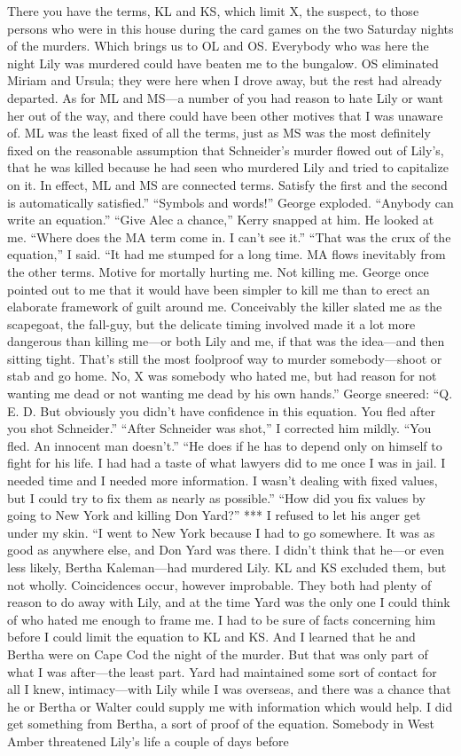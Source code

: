 \documentclass{novel}
\begin{document}
There you have the terms, KL and KS, which limit X, the suspect, to those persons who were in this house during the card games on the two Saturday nights of the murders. Which brings us to OL and OS. Everybody who was here the night Lily was murdered could have beaten me to the bungalow. OS eliminated Miriam and Ursula; they were here when I drove away, but the rest had already departed. As for ML and MS—a number of you had reason to hate Lily or want her out of the way, and there could have been other motives that I was unaware of. ML was the least fixed of all the terms, just as MS was the most definitely fixed on the reasonable assumption that Schneider’s murder flowed out of Lily’s, that he was killed because he had seen who murdered Lily and tried to capitalize on it. In effect, ML and MS are connected terms. Satisfy the first and the second is automatically satisfied.” “Symbols and words!” George exploded. “Anybody can write an equation.” “Give Alec a chance,” Kerry snapped at him. He looked at me. “Where does the MA term come in. I can’t see it.” “That was the crux of the equation,” I said. “It had me stumped for a long time. MA flows inevitably from the other terms. Motive for mortally hurting me. Not killing me. George once pointed out to me that it would have been simpler to kill me than to erect an elaborate framework of guilt around me. Conceivably the killer slated me as the scapegoat, the fall-guy, but the delicate timing involved made it a lot more dangerous than killing me—or both Lily and me, if that was the idea—and then sitting tight. That’s still the most foolproof way to murder somebody—shoot or stab and go home. No, X was somebody who hated me, but had reason for not wanting me dead or not wanting me dead by his own hands.” George sneered: “Q. E. D. But obviously you didn’t have confidence in this equation. You fled after you shot Schneider.” “After Schneider was shot,” I corrected him mildly. “You fled. An innocent man doesn’t.” “He does if he has to depend only on himself to fight for his life. I had had a taste of what lawyers did to me once I was in jail. I needed time and I needed more information. I wasn’t dealing with fixed values, but I could try to fix them as nearly as possible.” “How did you fix values by going to New York and killing Don Yard?” *** I refused to let his anger get under my skin. “I went to New York because I had to go somewhere. It was as good as anywhere else, and Don Yard was there. I didn’t think that he—or even less likely, Bertha Kaleman—had murdered Lily. KL and KS excluded them, but not wholly. Coincidences occur, however improbable. They both had plenty of reason to do away with Lily, and at the time Yard was the only one I could think of who hated me enough to frame me. I had to be sure of facts concerning him before I could limit the equation to KL and KS. And I learned that he and Bertha were on Cape Cod the night of the murder. But that was only part of what I was after—the least part. Yard had maintained some sort of contact for all I knew, intimacy—with Lily while I was overseas, and there was a chance that he or Bertha or Walter could supply me with information which would help. I did get something from Bertha, a sort of proof of the equation. Somebody in West Amber threatened Lily’s life a couple of days before 
\end{document}
